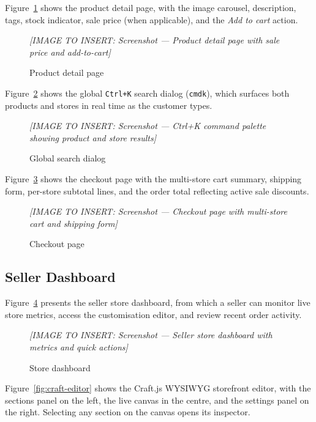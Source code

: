 \documentclass[12pt, a4paper, oneside]{report}
\newcommand{\imagePlaceholder}[2][8cm]{%
  \begin{mdframed}[backgroundcolor=cheebolightgray,linecolor=gray!40]
    \centering
    \vspace{#1}
    \textit{\color{gray}[IMAGE TO INSERT: #2]}
    \vspace{8mm}
  \end{mdframed}
}
\begin{document}
Figure~\ref{fig:product-detail} shows the product detail page,
with the image carousel, description, tags, stock indicator,
sale price (when applicable), and the \textit{Add to cart} action.

\begin{figure}[H]
  \centering
  \imagePlaceholder[8cm]{Screenshot — Product detail page with sale price and add-to-cart}
  \caption{Product detail page}
  \label{fig:product-detail}
\end{figure}

Figure~\ref{fig:search} shows the global \texttt{Ctrl+K} search
dialog (\texttt{cmdk}), which surfaces both products and stores in
real time as the customer types.

\begin{figure}[H]
  \centering
  \imagePlaceholder[6cm]{Screenshot — Ctrl+K command palette showing product and store results}
  \caption{Global search dialog}
  \label{fig:search}
\end{figure}

Figure~\ref{fig:checkout} shows the checkout page with the
multi-store cart summary, shipping form, per-store subtotal lines,
and the order total reflecting active sale discounts.

\begin{figure}[H]
  \centering
  \imagePlaceholder[8cm]{Screenshot — Checkout page with multi-store cart and shipping form}
  \caption{Checkout page}
  \label{fig:checkout}
\end{figure}

\subsection{Seller Dashboard}

Figure~\ref{fig:store-dashboard} presents the seller store dashboard,
from which a seller can monitor live store metrics, access the
customisation editor, and review recent order activity.

\begin{figure}[H]
  \centering
  \imagePlaceholder[8cm]{Screenshot — Seller store dashboard with metrics and quick actions}
  \caption{Store dashboard}
  \label{fig:store-dashboard}
\end{figure}

Figure~\ref{fig:craft-editor} shows the Craft.js WYSIWYG storefront
editor, with the sections panel on the left, the live canvas in the
centre, and the settings panel on the right. Selecting any section
on the canvas opens its inspector.
\end{document}
